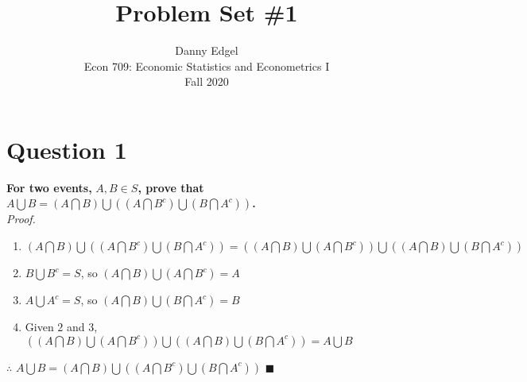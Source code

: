 \documentclass{article}
\newcommand{\union}{\bigcup}
\newcommand{\intersect}{\bigcap}
\begin{document}
\title{	Problem Set \#1 }
\author{ 	Danny Edgel 										\\ 
			Econ 709: Economic Statistics and Econometrics I	\\
			Fall 2020											\\
		}
\maketitle\thispagestyle{empty}


\section*{Question 1}
\textbf{For two events,} $A,B\in S$\textbf{, prove that} $A\union B=(A\intersect B)\union((A\intersect B^c)\union(B\intersect A^c))$\textbf{.}
\medskip \\
\textit{Proof.}
\begin{enumerate}
	\item $(A\intersect B)\union((A\intersect B^c)\union(B\intersect A^c)) = ((A\intersect B)\union(A\intersect B^c))\union((A\intersect B)\union(B\intersect A^c))$
	\item $B\union B^c=S$, so $(A\intersect B)\union(A\intersect B^c)=A$
	\item $A\union A^c=S$, so $(A\intersect B)\union(B\intersect A^c)=B$
	\item Given $2$ and $3$, $((A\intersect B)\union(A\intersect B^c))\union((A\intersect B)\union(B\intersect A^c)) = A\union B$
\end{enumerate}
$\therefore$ $A\union B = (A\intersect B)\union((A\intersect B^c)\union(B\intersect A^c))$ $\blacksquare$

\end{document}
